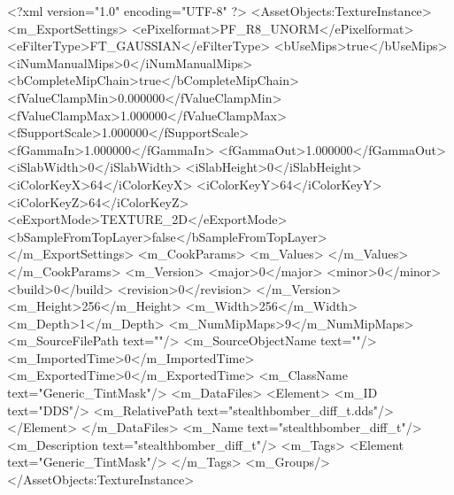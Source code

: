 <?xml version="1.0" encoding="UTF-8" ?>
<AssetObjects:TextureInstance>
<m_ExportSettings>
<ePixelformat>PF_R8_UNORM</ePixelformat>
<eFilterType>FT_GAUSSIAN</eFilterType>
<bUseMips>true</bUseMips>
<iNumManualMips>0</iNumManualMips>
<bCompleteMipChain>true</bCompleteMipChain>
<fValueClampMin>0.000000</fValueClampMin>
<fValueClampMax>1.000000</fValueClampMax>
<fSupportScale>1.000000</fSupportScale>
<fGammaIn>1.000000</fGammaIn>
<fGammaOut>1.000000</fGammaOut>
<iSlabWidth>0</iSlabWidth>
<iSlabHeight>0</iSlabHeight>
<iColorKeyX>64</iColorKeyX>
<iColorKeyY>64</iColorKeyY>
<iColorKeyZ>64</iColorKeyZ>
<eExportMode>TEXTURE_2D</eExportMode>
<bSampleFromTopLayer>false</bSampleFromTopLayer>
</m_ExportSettings>
<m_CookParams>
<m_Values>
</m_Values>
</m_CookParams>
<m_Version>
<major>0</major>
<minor>0</minor>
<build>0</build>
<revision>0</revision>
</m_Version>
<m_Height>256</m_Height>
<m_Width>256</m_Width>
<m_Depth>1</m_Depth>
<m_NumMipMaps>9</m_NumMipMaps>
<m_SourceFilePath text=""/>
<m_SourceObjectName text=""/>
<m_ImportedTime>0</m_ImportedTime>
<m_ExportedTime>0</m_ExportedTime>
<m_ClassName text="Generic_TintMask"/>
<m_DataFiles>
<Element>
<m_ID text="DDS"/>
<m_RelativePath text="stealthbomber_diff_t.dds"/>
</Element>
</m_DataFiles>
<m_Name text="stealthbomber_diff_t"/>
<m_Description text="stealthbomber_diff_t"/>
<m_Tags>
<Element text="Generic_TintMask"/>
</m_Tags>
<m_Groups/>
</AssetObjects:TextureInstance>
